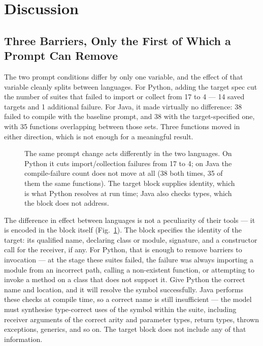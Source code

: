 \section{Discussion}\label{sec:discussion}

\subsection{Three Barriers, Only the First of Which a Prompt Can Remove}
\label{sec:barriers}

The two prompt conditions differ by only one variable, and the effect of that variable cleanly
splits between languages. For Python, adding the target spec cut the number of suites that
failed to import or collect from 17 to 4 --- 14 saved targets and 1 additional failure. For
Java, it made virtually no difference: 38 failed to compile with the baseline prompt, and 38
with the target-specified one, with 35 functions overlapping between those sets. Three
functions moved in either direction, which is not enough for a meaningful result.

\begin{figure}[t]
\centering

\caption{The same prompt change acts differently in the two languages. On Python it cuts
import/collection failures from 17 to 4; on Java the compile-failure count does not move at
all (38 both times, 35 of them the same functions). The target block supplies identity, which
is what Python resolves at run time; Java also checks types, which the block does not
address.}
\label{fig:barriers}
\end{figure}

The difference in effect between languages is not a peculiarity of their tools --- it is
encoded in the block itself (Fig.~\ref{fig:barriers}). The block specifies the identity of the target: its qualified
name, declaring class or module, signature, and a constructor call for the receiver, if any.
For Python, that is enough to remove barriers to invocation --- at the stage these suites
failed, the failure was always importing a module from an incorrect path, calling a
non-existent function, or attempting to invoke a method on a class that does not support it.
Give Python the correct name and location, and it will resolve the symbol successfully. Java
performs these checks at compile time, so a correct name is still insufficient --- the model
must synthesise type-correct uses of the symbol within the suite, including receiver arguments
of the correct arity and parameter types, return types, thrown exceptions, generics, and so
on. The target block does not include any of that information.

